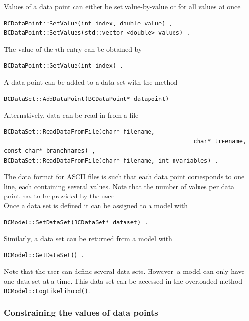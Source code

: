 \documentclass[11pt, a4paper]{article}
\begin{document}
\noindent
Values of a data point can either be set value-by-value or for all
values at once
%
\begin{verbatim}
BCDataPoint::SetValue(int index, double value) ,
BCDataPoint::SetValues(std::vector <double> values) .
\end{verbatim}

\noindent
The value of the $i$th entry can be obtained by
%
\begin{verbatim}
BCDataPoint::GetValue(int index) .
\end{verbatim}

\noindent
A data point can be added to a data set with the method

\begin{verbatim}
BCDataSet::AddDataPoint(BCDataPoint* datapoint) .
\end{verbatim}

\noindent
Alternatively, data can be read in from a file
%
\begin{verbatim}
BCDataSet::ReadDataFromFile(char* filename,
													  char* treename, const char* branchnames) ,
BCDataSet::ReadDataFromFile(char* filename, int nvariables) .
\end{verbatim}

\noindent
The data format for ASCII files is such that each data point
corresponds to one line, each containing several values. Note that the
number of values per data point has to be provided by the user. \\

\noindent
Once a data set is defined it can be assigned to a model with
%
\begin{verbatim}
BCModel::SetDataSet(BCDataSet* dataset) .
\end{verbatim}

\noindent
Similarly, a data set can be returned from a model with
%
\begin{verbatim}
BCModel::GetDataSet() .
\end{verbatim}

\noindent
Note that the user can define several data sets. However, a model can
only have one data set at a time. This data set can be accessed in the
overloaded method \verb|BCModel::LogLikelihood()|.


\subsubsection{Constraining the values of data points}
\end{document}
